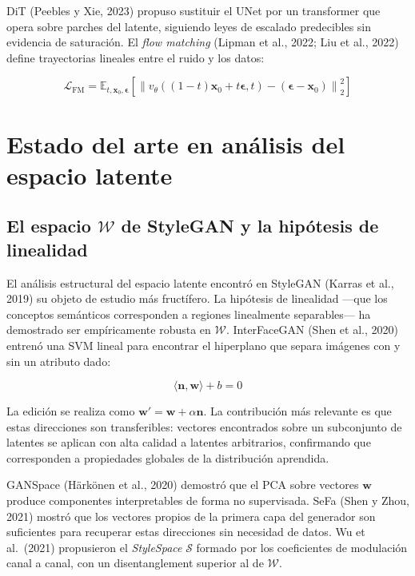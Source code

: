 \documentclass[12pt, a4paper, twoside]{book}
\newcommand{\x}{\mathbf{x}}
\newcommand{\eps}{\boldsymbol{\epsilon}}
\newcommand{\E}{\mathbb{E}}
\begin{document}
DiT (Peebles y Xie, 2023) propuso sustituir el UNet por un transformer que opera sobre parches del latente, siguiendo leyes de escalado predecibles sin evidencia de saturación. El \textit{flow matching} (Lipman et al., 2022; Liu et al., 2022) define trayectorias lineales entre el ruido y los datos:

\begin{equation}
\mathcal{L}_{\text{FM}} = \E_{t, \x_0, \eps}\!\left[\left\|v_\theta((1-t)\x_0 + t\eps, t) - (\eps - \x_0)\right\|_2^2\right]
\end{equation}

\section{Estado del arte en análisis del espacio latente}
\label{sec:sota}

\subsection{El espacio $\mathcal{W}$ de StyleGAN y la hipótesis de linealidad}

El análisis estructural del espacio latente encontró en StyleGAN (Karras et al., 2019) su objeto de estudio más fructífero. La hipótesis de linealidad ---que los conceptos semánticos corresponden a regiones linealmente separables--- ha demostrado ser empíricamente robusta en $\mathcal{W}$. InterFaceGAN (Shen et al., 2020) entrenó una SVM lineal para encontrar el hiperplano que separa imágenes con y sin un atributo dado:

\begin{equation}
\langle \mathbf{n}, \mathbf{w} \rangle + b = 0
\end{equation}

La edición se realiza como $\mathbf{w}' = \mathbf{w} + \alpha\mathbf{n}$. La contribución más relevante es que estas direcciones son transferibles: vectores encontrados sobre un subconjunto de latentes se aplican con alta calidad a latentes arbitrarios, confirmando que corresponden a propiedades globales de la distribución aprendida.

GANSpace (Härkönen et al., 2020) demostró que el PCA sobre vectores $\mathbf{w}$ produce componentes interpretables de forma no supervisada. SeFa (Shen y Zhou, 2021) mostró que los vectores propios de la primera capa del generador son suficientes para recuperar estas direcciones sin necesidad de datos. Wu et al.\ (2021) propusieron el \textit{StyleSpace} $\mathcal{S}$ formado por los coeficientes de modulación canal a canal, con un disentanglement superior al de $\mathcal{W}$.
\end{document}

